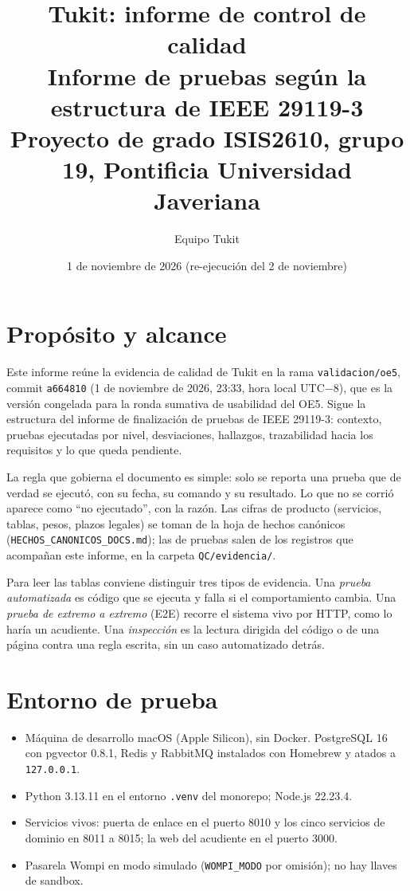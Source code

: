 \documentclass[11pt,letterpaper]{article}
\title{Tukit: informe de control de calidad\\[4pt]
\large Informe de pruebas según la estructura de IEEE 29119-3\\
Proyecto de grado ISIS2610, grupo 19, Pontificia Universidad Javeriana}
\author{Equipo Tukit}
\date{1 de noviembre de 2026 (re-ejecución del 2 de noviembre)}
\newcommand{\ruta}[1]{\texttt{\small #1}}
\begin{document}
\maketitle

\section{Propósito y alcance}

Este informe reúne la evidencia de calidad de Tukit en la rama \ruta{validacion/\allowbreak{}oe5}, commit \ruta{a664810}
(1 de noviembre de 2026, 23:33, hora local UTC$-$8), que es la versión congelada para la ronda sumativa de
usabilidad del OE5. Sigue la estructura del informe de finalización de pruebas de IEEE 29119-3: contexto,
pruebas ejecutadas por nivel, desviaciones, hallazgos, trazabilidad hacia los requisitos y lo que queda pendiente.

La regla que gobierna el documento es simple: solo se reporta una prueba que de verdad se ejecutó, con su
fecha, su comando y su resultado. Lo que no se corrió aparece como ``no ejecutado'', con la razón. Las cifras
de producto (servicios, tablas, pesos, plazos legales) se toman de la hoja de hechos canónicos
(\ruta{HECHOS\_\allowbreak{}CANONICOS\_\allowbreak{}DOCS.md}); las de pruebas salen de los registros que acompañan este informe, en la
carpeta \ruta{QC/\allowbreak{}evidencia/}.

Para leer las tablas conviene distinguir tres tipos de evidencia. Una \emph{prueba automatizada} es código que
se ejecuta y falla si el comportamiento cambia. Una \emph{prueba de extremo a extremo} (E2E) recorre el sistema
vivo por HTTP, como lo haría un acudiente. Una \emph{inspección} es la lectura dirigida del código o de una
página contra una regla escrita, sin un caso automatizado detrás.

\section{Entorno de prueba}

\begin{itemize}
  \item Máquina de desarrollo macOS (Apple Silicon), sin Docker. PostgreSQL 16 con pgvector 0.8.1,
        Redis y RabbitMQ instalados con Homebrew y atados a \ruta{127.0.0.1}.
  \item Python 3.13.11 en el entorno \ruta{.venv} del monorepo; Node.js 22.23.4.
  \item Servicios vivos: puerta de enlace en el puerto 8010 y los cinco servicios de dominio en 8011 a 8015;
        la web del acudiente en el puerto 3000.
  \item Pasarela Wompi en modo simulado (\ruta{WOMPI\_\allowbreak{}MODO} por omisión); no hay llaves de sandbox.
\end{itemize}
\end{document}
